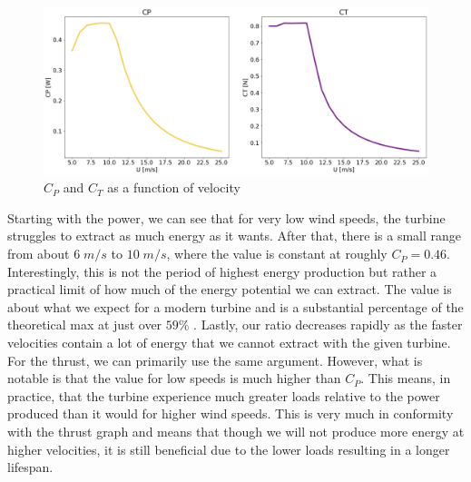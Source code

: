 \begin{figure}[H]
    \centering
    \includegraphics[scale=0.3]{Illustrations/CPCTsweep.png}
    \caption{$C_P$ and $C_T$ as a function of velocity}
    \label{fig:powerthrust}
\end{figure}

Starting with the power, we can see that for very low wind speeds, the turbine struggles to extract as much energy as it wants. After that, there is a small range from about $6 \; m/s$ to  $10 \; m/s$, where the value is constant at roughly $C_P=0.46$. Interestingly, this is not the period of highest energy production but rather a practical limit of how much of the energy potential we can extract. The value is about what we expect for a modern turbine and is a substantial percentage of the theoretical max at just over $59\%$ \cite{betzlimit}. Lastly, our ratio decreases rapidly as the faster velocities contain a lot of energy that we cannot extract with the given turbine. For the thrust, we can primarily use the same argument. However, what is notable is that the value for low speeds is much higher than $C_P$. This means, in practice, that the turbine experience much greater loads relative to the power produced than it would for higher wind speeds. This is very much in conformity with the thrust graph and means that though we will not produce more energy at higher velocities, it is still beneficial due to the lower loads resulting in a longer lifespan. 